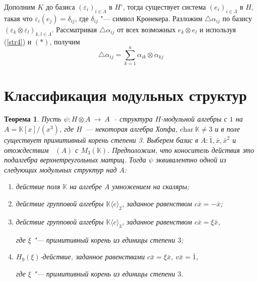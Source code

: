 \documentclass[a4paper, 12pt]{article}
\DeclareMathOperator{\End}{\mathrm{End}_{\mathbb{K}}}
\newtheorem*{theorem}{\hspace*{\parindent}Теорема}
\theoremstyle{definition}
\begin{document}
Дополним $K$ до базиса $(\varepsilon_i)_{i \in \Lambda}$ в $H^\circ$, тогда существует система $(e_i)_{i \in \Lambda}$ в $H$, такая что $\varepsilon_i(e_j) = \delta_{ij}$, где $\delta_{ij}$ "--- символ Кронекера. 
Разложим $\bigtriangleup\alpha_{ij}$ по базису $(\varepsilon_k \otimes \varepsilon_l)_{k, l \in \Lambda}$. Рассматривая $\bigtriangleup\alpha_{ij}$ от всех возможных $e_k \otimes e_l$ и используя (\ref{str4}) и $(*)$, получим 
$$\bigtriangleup\alpha_{ij} = \sum\limits_{k=1}^{n}\alpha_{ik} \otimes \alpha_{kj}$$


\newpage

\section{Классификация модульных структур}

\begin{theorem}
	Пусть $\psi:H \otimes A\ \to \ A $~-- структура $H$-модульной алгебры с $1$ на $A = \mathbb{K}[x]/(x^3)$, где $H$~--- некоторая алгебра Хопфа, $\mathrm{char} \ \mathbb{K} \neq 3$ и в поле существует примитивный корень степени 3. Выберем базис в $A: \bar 1, \bar x, \bar x^2$ и отождествим $\End(A)$ с $M_3(\mathbb{K})$. Предположим, что коноситель действия это подалгебра верхнетреугольных матриц. Тогда $\psi$ эквивалентно одной из следующих модульных структур над $A$:
    
    \begin{enumerate}
        \item действие поля $\mathbb{K}$ на алгебре $A$ умножением на скаляры; \label{scalar}
        
        \item действие групповой алгебры $\mathbb{K}\langle c\rangle_2$, заданное равенством 
        ${c\bar{x} = -\bar{x}}$; \label{eps=b^2}
        
        \item действие групповой алгебры $\mathbb{K}\langle c \rangle_3$, заданное равенством $c\bar{x} = \xi \bar{x}$,
        
        где $\xi$ "--- примитивный корень из единицы степени $3$;\label{diagonal} 
        
        \item $H_9(\xi)$-действие, заданное равенствами $c\bar{x}=\xi\bar{x},\ v\bar{x}= \bar{1}$, 
        
        где $\xi$ "--- примитивный корень из единицы степени $3$. \label{all}
        
    \end{enumerate}
\end{theorem}
\end{document}
